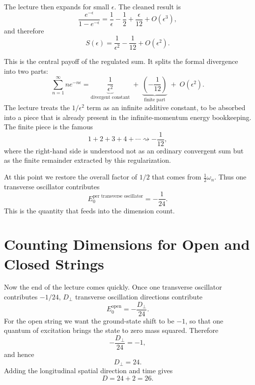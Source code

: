 The lecture then expands for small \(\epsilon\). The cleaned result is
\begin{equation}
\frac{e^{-\epsilon}}{1-e^{-\epsilon}}
=
\frac{1}{\epsilon}-\frac{1}{2}+\frac{\epsilon}{12}+O(\epsilon^{3}),
\end{equation}
and therefore
\begin{equation}
S(\epsilon)
=
\frac{1}{\epsilon^{2}}-\frac{1}{12}+O(\epsilon^{2}).
\end{equation}

This is the central payoff of the regulated sum. It splits the formal divergence into two parts:
\begin{equation}
\sum_{n=1}^{\infty} n e^{-n\epsilon}
=
\underbrace{\frac{1}{\epsilon^{2}}}_{\text{divergent constant}}
\;+\;
\underbrace{\left(-\frac{1}{12}\right)}_{\text{finite part}}
\;+\;
O(\epsilon^{2}).
\end{equation}
The lecture treats the \(1/\epsilon^{2}\) term as an infinite additive constant, to be absorbed into a piece that is already present in the infinite-momentum energy bookkeeping. The finite piece is the famous
\begin{equation}
1+2+3+4+\cdots \rightsquigarrow -\frac{1}{12},
\end{equation}
where the right-hand side is understood not as an ordinary convergent sum but as the finite remainder extracted by this regularization.

At this point we restore the overall factor of \(1/2\) that comes from \(\frac{1}{2}\omega_{n}\). Thus one transverse oscillator contributes
\begin{equation}
E_{0}^{\text{per transverse oscillator}}=-\frac{1}{24}.
\end{equation}
This is the quantity that feeds into the dimension count.

\section{Counting Dimensions for Open and Closed Strings}

Now the end of the lecture comes quickly. Once one transverse oscillator contributes \(-1/24\), \(D_{\perp}\) transverse oscillation directions contribute
\begin{equation}
E_{0}^{\text{open}}=-\frac{D_{\perp}}{24}.
\end{equation}
For the open string we want the ground-state shift to be \(-1\), so that one quantum of excitation brings the state to zero mass squared. Therefore
\begin{equation}
-\frac{D_{\perp}}{24}=-1,
\end{equation}
and hence
\begin{equation}
D_{\perp}=24.
\end{equation}
Adding the longitudinal spatial direction and time gives
\begin{equation}
D=24+2=26.
\end{equation}

